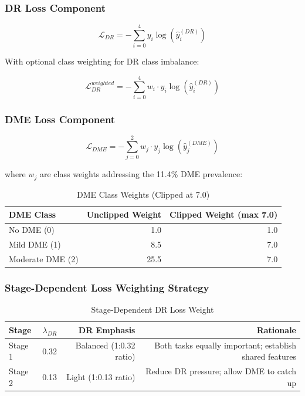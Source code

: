 \documentclass[12pt,a4paper]{article}
\begin{document}
\subsubsection{DR Loss Component}

\begin{equation}
\mathcal{L}_{DR} = -\sum_{i=0}^{4} y_i \log(\hat{y}_i^{(DR)})
\end{equation}

With optional class weighting for DR class imbalance:

\begin{equation}
\mathcal{L}_{DR}^{weighted} = -\sum_{i=0}^{4} w_i \cdot y_i \log(\hat{y}_i^{(DR)})
\end{equation}

\subsubsection{DME Loss Component}

\begin{equation}
\mathcal{L}_{DME} = -\sum_{j=0}^{2} w_j \cdot y_j \log(\hat{y}_j^{(DME)})
\end{equation}

where $w_j$ are class weights addressing the 11.4\% DME prevalence:

\begin{table}[H]
\centering
\small
\caption{DME Class Weights (Clipped at 7.0)}
\begin{tabular}{|l|r|r|}
\hline
\textbf{DME Class} & \textbf{Unclipped Weight} & \textbf{Clipped Weight (max 7.0)} \\
\hline
No DME (0) & 1.0 & 1.0 \\
Mild DME (1) & 8.5 & 7.0 \\
Moderate DME (2) & 25.5 & 7.0 \\
\hline
\end{tabular}
\end{table}

\subsubsection{Stage-Dependent Loss Weighting Strategy}

\begin{table}[H]
\centering
\small
\caption{Stage-Dependent DR Loss Weight}
\begin{tabular}{|l|r|r|r|}
\hline
\textbf{Stage} & \textbf{$\lambda_{DR}$} & \textbf{DR Emphasis} & \textbf{Rationale} \\
\hline
Stage 1 & 0.32 & Balanced (1:0.32 ratio) & Both tasks equally important; establish shared features \\
Stage 2 & 0.13 & Light (1:0.13 ratio) & Reduce DR pressure; allow DME to catch up \\
\hline
\end{tabular}
\end{table}
\end{document}
